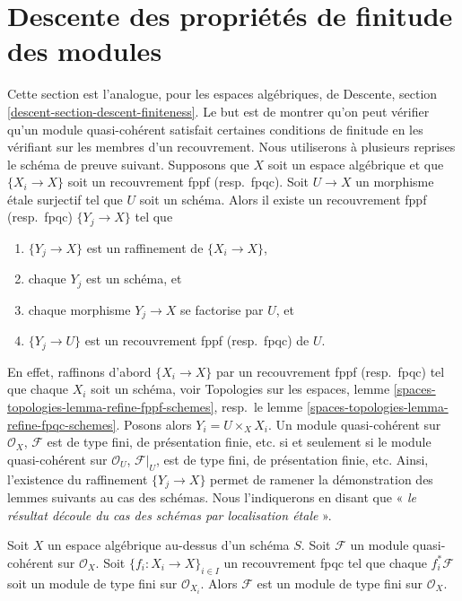 \section{Descente des propriétés de finitude des modules}
\label{section-descent-finiteness}

\noindent
Cette section est l'analogue, pour les espaces algébriques, de
Descente, section \ref{descent-section-descent-finiteness}.
Le but est de montrer qu'on peut vérifier qu'un module quasi-cohérent
satisfait certaines conditions de finitude en les vérifiant sur les membres d'un
recouvrement. Nous utiliserons à plusieurs reprises le schéma de preuve suivant.
Supposons que $X$ soit un espace algébrique et que $\{X_i \to X\}$
soit un recouvrement fppf (resp.\ fpqc). Soit $U \to X$ un morphisme \'etale
surjectif tel que $U$ soit un schéma. Alors il existe un
recouvrement fppf (resp.\ fpqc) $\{Y_j \to X\}$ tel que
\begin{enumerate}
\item $\{Y_j \to X\}$ est un raffinement de $\{X_i \to X\}$,
\item chaque $Y_j$ est un schéma, et
\item chaque morphisme $Y_j \to X$ se factorise par $U$, et
\item $\{Y_j \to U\}$ est un recouvrement fppf (resp.\ fpqc) de $U$.
\end{enumerate}
En effet, raffinons d'abord $\{X_i \to X\}$ par un recouvrement fppf (resp.\ fpqc)
tel que chaque $X_i$ soit un schéma, voir
Topologies sur les espaces, lemme \ref{spaces-topologies-lemma-refine-fppf-schemes},
resp.\ le lemme \ref{spaces-topologies-lemma-refine-fpqc-schemes}.
Posons alors $Y_i = U \times_X X_i$. Un module quasi-cohérent
sur $\mathcal{O}_X$, $\mathcal{F}$ est de type fini, de
présentation finie, etc. si et seulement si le module quasi-cohérent
sur $\mathcal{O}_U$, $\mathcal{F}|_U$, est de type fini, de
présentation finie, etc. Ainsi, l'existence du
raffinement $\{Y_j \to X\}$ permet de ramener la démonstration des
lemmes suivants au cas des schémas. Nous l'indiquerons en disant
que « {\it le résultat découle du cas des schémas par
localisation \'etale} ».

\begin{lemma}
\label{lemma-finite-type-descends}
Soit $X$ un espace algébrique au-dessus d'un schéma $S$.
Soit $\mathcal{F}$ un module quasi-cohérent sur $\mathcal{O}_X$.
Soit $\{f_i : X_i \to X\}_{i \in I}$ un recouvrement fpqc tel que
chaque $f_i^*\mathcal{F}$ soit un module de type fini sur $\mathcal{O}_{X_i}$.
Alors $\mathcal{F}$ est un module de type fini sur $\mathcal{O}_X$.
\end{lemma}

